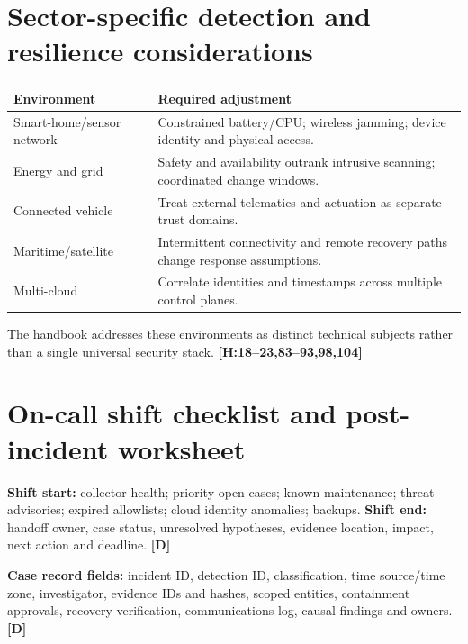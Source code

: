 \documentclass[10pt,letterpaper,oneside]{article}
\newcommand{\handbookref}[1]{\textsf{\color{accent}\textbf{[H:#1]}}}
\newcommand{\designed}{\textsf{\color{accent}\textbf{[D]}}}
\begin{document}
\section{Sector-specific detection and resilience considerations}
\par\medskip\noindent\begin{tabularx}{\textwidth}{@{}p{}X@{}}\toprule
Environment & Required adjustment \\ \midrule
Smart-home/sensor network & Constrained battery/CPU; wireless jamming; device identity and physical access.\\
Energy and grid & Safety and availability outrank intrusive scanning; coordinated change windows.\\
Connected vehicle & Treat external telematics and actuation as separate trust domains.\\
Maritime/satellite & Intermittent connectivity and remote recovery paths change response assumptions.\\
Multi-cloud & Correlate identities and timestamps across multiple control planes.\\
\bottomrule\end{tabularx}\par\medskip
The handbook addresses these environments as distinct technical subjects rather than a single universal security stack. \handbookref{18--23,83--93,98,104}

\section{On-call shift checklist and post-incident worksheet}
\textbf{Shift start:} collector health; priority open cases; known maintenance; threat advisories; expired allowlists; cloud identity anomalies; backups. \textbf{Shift end:} handoff owner, case status, unresolved hypotheses, evidence location, impact, next action and deadline. \designed{}
\begin{sourcebox}\textbf{Case record fields:} incident ID, detection ID, classification, time source/time zone, investigator, evidence IDs and hashes, scoped entities, containment approvals, recovery verification, communications log, causal findings and owners. \designed{}\end{sourcebox}
\end{document}
